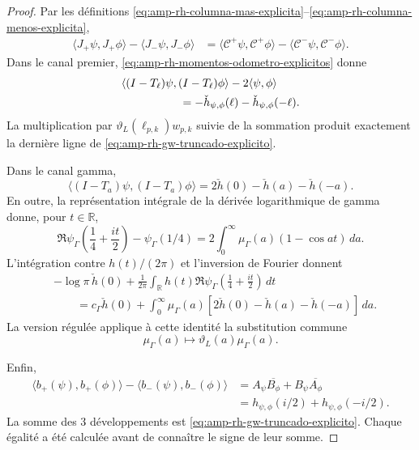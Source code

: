 \begin{proof}
Par les définitions \eqref{eq:amp-rh-columna-mas-explicita}--\eqref{eq:amp-rh-columna-menos-explicita},
\begin{align}
 \langle J_+\psi,J_+\phi\rangle
 -\langle J_-\psi,J_-\phi\rangle
 &=
 \langle\mathcal C^+\psi,\mathcal C^+\phi\rangle
 -\langle\mathcal C^-\psi,\mathcal C^-\phi\rangle .
 \label{eq:amp-rh-expansion-inicial}
\end{align}
Dans le canal premier, \eqref{eq:amp-rh-momentos-odometro-explicitos} donne
\begin{align*}
 &\langle(I-T_\ell)\psi,(I-T_\ell)\phi\rangle
 -2\langle\psi,\phi\rangle\\
 &\hspace{18mm}
 =-\check h_{\psi,\phi}(\ell)
  -\check h_{\psi,\phi}(-\ell).
\end{align*}
La multiplication par \(\vartheta_L(\ell_{p,k})w_{p,k}\) suivie de la sommation produit exactement la dernière ligne de \eqref{eq:amp-rh-gw-truncado-explicito}.

Dans le canal gamma,
\[
 \langle(I-T_a)\psi,(I-T_a)\phi\rangle
 =2\check h(0)-\check h(a)-\check h(-a).
\]
En outre, la représentation intégrale de la dérivée logarithmique de gamma donne, pour \(t\in\mathbb R\),
\begin{equation}\label{eq:amp-rh-digamma-longitudes}
 \Re\psi_\Gamma\!\left(\frac14+\frac{it}{2}\right)-\psi_\Gamma(1/4)
 =2\int_0^\infty\mu_\Gamma(a)(1-\cos at)\,da .
\end{equation}
L'intégration contre \(h(t)/(2\pi)\) et l'inversion de Fourier donnent
\begin{align*}
 &-\log\pi\,\check h(0)
 +\frac1{2\pi}\int_{\mathbb R}h(t)
  \Re\psi_\Gamma\!\left(\frac14+\frac{it}{2}\right)\,dt\\
 &\qquad =
 c_\Gamma\check h(0)
 +\int_0^\infty\mu_\Gamma(a)
  [2\check h(0)-\check h(a)-\check h(-a)]\,da .
\end{align*}
La version régulée applique à cette identité la substitution commune
\[
 \mu_\Gamma(a)\longmapsto
 \vartheta_L(a)\mu_\Gamma(a).
\]

Enfin,
\begin{align*}
 \langle b_+(\psi),b_+(\phi)\rangle
 -\langle b_-(\psi),b_-(\phi)\rangle
 &=
 A_\psi\overline{B_\phi}
 +B_\psi\overline{A_\phi}\\
 &=h_{\psi,\phi}(i/2)+h_{\psi,\phi}(-i/2).
\end{align*}
La somme des \(3\) développements est \eqref{eq:amp-rh-gw-truncado-explicito}. Chaque égalité a été calculée avant de connaître le signe de leur somme.
\end{proof}

